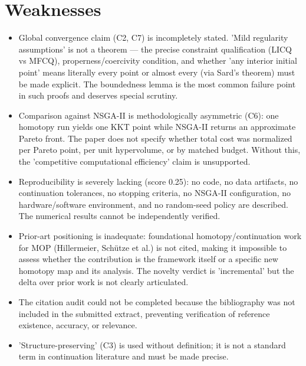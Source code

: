 \documentclass[11pt]{article}
\begin{document}
\section*{Weaknesses}
\begin{itemize}[leftmargin=*]
  \item Global convergence claim (C2, C7) is incompletely stated. 'Mild regularity assumptions' is not a theorem — the precise constraint qualification (LICQ vs MFCQ), properness/coercivity condition, and whether 'any interior initial point' means literally every point or almost every (via Sard's theorem) must be made explicit. The boundedness lemma is the most common failure point in such proofs and deserves special scrutiny.
  \item Comparison against NSGA-II is methodologically asymmetric (C6): one homotopy run yields one KKT point while NSGA-II returns an approximate Pareto front. The paper does not specify whether total cost was normalized per Pareto point, per unit hypervolume, or by matched budget. Without this, the 'competitive computational efficiency' claim is unsupported.
  \item Reproducibility is severely lacking (score 0.25): no code, no data artifacts, no continuation tolerances, no stopping criteria, no NSGA-II configuration, no hardware/software environment, and no random-seed policy are described. The numerical results cannot be independently verified.
  \item Prior-art positioning is inadequate: foundational homotopy/continuation work for MOP (Hillermeier, Schütze et al.) is not cited, making it impossible to assess whether the contribution is the framework itself or a specific new homotopy map and its analysis. The novelty verdict is 'incremental' but the delta over prior work is not clearly articulated.
  \item The citation audit could not be completed because the bibliography was not included in the submitted extract, preventing verification of reference existence, accuracy, or relevance.
  \item 'Structure-preserving' (C3) is used without definition; it is not a standard term in continuation literature and must be made precise.
\end{itemize}
\end{document}
